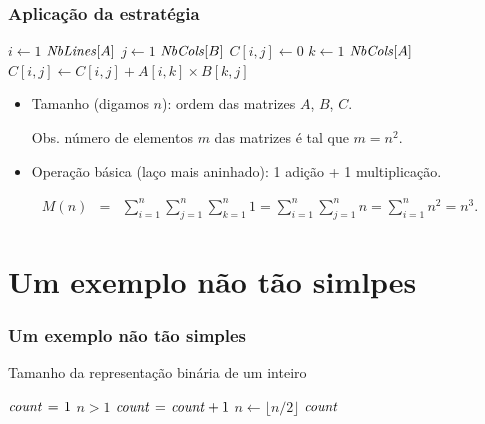 \documentclass[handout]{beamer}
\begin{document}
\begin{frame}
\frametitle{Aplicação da estratégia}

\begin{small}
\begin{codebox}
\li \For $i \gets 1$ \To $\id{NbLines}[A]$
\li \Do
\li   \For $j \gets 1$ \To $\id{NbCols}[B]$
\li   \Do
\li     $C[i,j] \gets 0$
\li     \For $k \gets 1$ \To $\id{NbCols}[A]$
\li     \Do
\li     $C[i,j] \gets C[i,j] + A[i, k] \times B[k, j]$
        \End    
      \End    
    \End    
\end{codebox}
\end{small}

\begin{itemize}
\item Tamanho (digamos $n$): ordem das matrizes $A$, $B$, $C$.

  Obs. número de elementos $m$ das matrizes é tal que $m = n^2$.
\item Operação básica (laço mais aninhado): 1 adição + 1 multiplicação. 
\end{itemize}
\begin{eqnarray*}
M(n) & = & \sum_{i=1}^n \sum_{j=1}^{n} \sum_{k=1}^n 1 = \sum_{i=1}^n \sum_{j=1}^{n} n = \sum_{i=1}^n n^2 = n^3. 
\end{eqnarray*}
\end{frame}

\section{Um exemplo não tão simlpes}
\begin{frame}
\frametitle{Um exemplo não tão simples}
\begin{example}{Tamanho da representação binária de um inteiro}
\begin{codebox}
\li $\id{count} \gets 1$
\li \While $n > 1$
\li \Do
\li   $\id{count} \gets \id{count}+1$
\li   $n \gets \lfloor n/2 \rfloor$
    \End    
\li \Return $\id{count}$
\end{codebox}
\end{example}
\end{frame}
\end{document}
